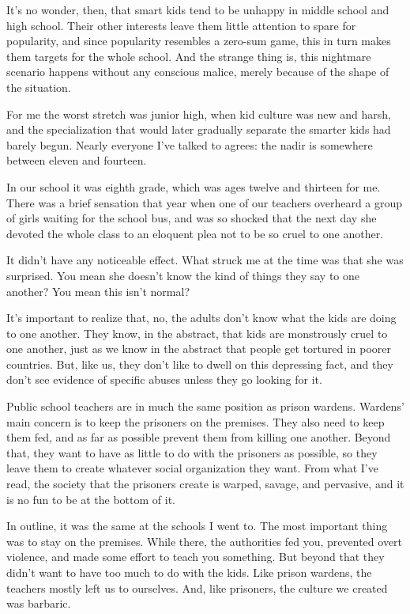 It's no wonder, then, that smart kids tend to be unhappy in middle
school and high school. Their other interests leave them little
attention to spare for popularity, and since popularity resembles a
zero-sum game, this in turn makes them targets for the whole school. And
the strange thing is, this nightmare scenario happens without any
conscious malice, merely because of the shape of the situation.

For me the worst stretch was junior high, when kid culture was new and
harsh, and the specialization that would later gradually separate the
smarter kids had barely begun. Nearly everyone I've talked to agrees:
the nadir is somewhere between eleven and fourteen.

In our school it was eighth grade, which was ages twelve and thirteen
for me. There was a brief sensation that year when one of our teachers
overheard a group of girls waiting for the school bus, and was so
shocked that the next day she devoted the whole class to an eloquent
plea not to be so cruel to one another.

It didn't have any noticeable effect. What struck me at the time was
that she was surprised. You mean she doesn't know the kind of things
they say to one another? You mean this isn't normal?

It's important to realize that, no, the adults don't know what the kids
are doing to one another. They know, in the abstract, that kids are
monstrously cruel to one another, just as we know in the abstract that
people get tortured in poorer countries. But, like us, they don't like
to dwell on this depressing fact, and they don't see evidence of
specific abuses unless they go looking for it.

Public school teachers are in much the same position as prison wardens.
Wardens' main concern is to keep the prisoners on the premises. They
also need to keep them fed, and as far as possible prevent them from
killing one another. Beyond that, they want to have as little to do with
the prisoners as possible, so they leave them to create whatever social
organization they want. From what I've read, the society that the
prisoners create is warped, savage, and pervasive, and it is no fun to
be at the bottom of it.

In outline, it was the same at the schools I went to. The most important
thing was to stay on the premises. While there, the authorities fed you,
prevented overt violence, and made some effort to teach you something.
But beyond that they didn't want to have too much to do with the kids.
Like prison wardens, the teachers mostly left us to ourselves. And, like
prisoners, the culture we created was barbaric.

